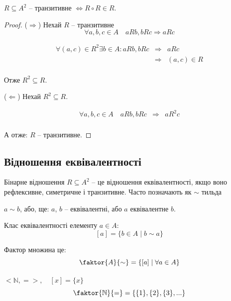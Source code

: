 \begin{theorem}
    $R \subseteq A^2$ -- транзитивне $\Leftrightarrow R \circ R \in R$.
\end{theorem}
\begin{proof}
    ($\Rightarrow$) Нехай $R$ -- транзитивне
    $$\forall a, b, c \in A \quad aRb, bRc \Rightarrow aRc$$

    $$\begin{array}{rcl}
        \forall (a, c) \in R^2 \exists b \in A: aRb, bRc
        & \Rightarrow  & aRc  \\
        & \Rightarrow  & (a, c) \in R \\
    \end{array}$$

    Отже $ R^2 \subseteq R$.

    ($\Leftarrow$) Нехай $R^2 \subseteq R$.

    $$\begin{array}{rcl}
        \forall a, b, c \in A \quad aRb, bRc
        & \Rightarrow  & aR^2c  \\
    \end{array}$$

    А отже: $R$ -- транзитивне.
\end{proof}


\subsection{Відношення еквівалентності}

\begin{definition}
    Бінарне відношення $R \subseteq A^2$ -- це відношення еквівалентності,
    якщо воно рефлексивне, симетричне і транзитивне. Часто позначають як $\sim$ тильда
\end{definition}
$a \sim b$, або, ще: $a$, $b$ -- еквівалентні, або $a$ еквівалентне $b$.

\begin{definition}
    Клас еквівалентності елементу $a \in A$:
    $$[a] = \{ b \in A \mid b \sim a \}$$
\end{definition}

\begin{definition}
    Фактор множина це:
    $$\faktor{A}{\sim} = \{ [a] \mid \forall a \in A \}$$
\end{definition}

\begin{example}
    $<\mathbb{N}, =>, \quad [x] = \{x\}$
    $$\faktor{\mathbb{N}}{=} = \{ \{1\}, \{2\}, \{3\}, ... \}$$
\end{example}

